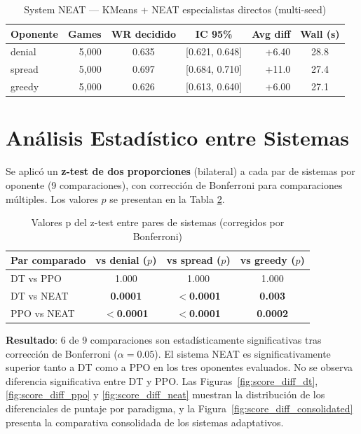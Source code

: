\begin{table}[H]
\centering
\caption{System NEAT --- KMeans + NEAT especialistas directos (multi-seed)}
\begin{tabular}{lrccrc}
\hline
\textbf{Oponente} & \textbf{Games} & \textbf{WR decidido} & \textbf{IC 95\%} & \textbf{Avg diff} & \textbf{Wall (s)} \\
\hline
denial & 5,000 & 0.635 & [0.621, 0.648] & +6.40 & 28.8 \\
spread & 5,000 & 0.697 & [0.684, 0.710] & +11.0 & 27.4 \\
greedy & 5,000 & 0.626 & [0.613, 0.640] & +6.00 & 27.1 \\
\hline
\end{tabular}
\label{tab:system_neat}
\end{table}

\section{Análisis Estadístico entre Sistemas}

Se aplicó un \textbf{z-test de dos proporciones} (bilateral) a cada par de sistemas por oponente (9 comparaciones), con corrección de Bonferroni para comparaciones múltiples. Los valores $p$ se presentan en la Tabla \ref{tab:ztest}.

\begin{table}[H]
\centering
\caption{Valores p del z-test entre pares de sistemas (corregidos por Bonferroni)}
\begin{tabular}{lccc}
\hline
\textbf{Par comparado} & \textbf{vs denial ($p$)} & \textbf{vs spread ($p$)} & \textbf{vs greedy ($p$)} \\
\hline
DT vs PPO   & 1.000 & 1.000 & 1.000 \\
DT vs NEAT  & \textbf{0.0001} & \textbf{$<$0.0001} & \textbf{0.003} \\
PPO vs NEAT & \textbf{$<$0.0001} & \textbf{$<$0.0001} & \textbf{0.0002} \\
\hline
\end{tabular}
\label{tab:ztest}
\end{table}

\textbf{Resultado}: 6 de 9 comparaciones son estadísticamente significativas tras corrección de Bonferroni ($\alpha = 0.05$). El sistema NEAT es significativamente superior tanto a DT como a PPO en los tres oponentes evaluados. No se observa diferencia significativa entre DT y PPO. Las Figuras~\ref{fig:score_diff_dt}, \ref{fig:score_diff_ppo} y \ref{fig:score_diff_neat} muestran la distribución de los diferenciales de puntaje por paradigma, y la Figura~\ref{fig:score_diff_consolidated} presenta la comparativa consolidada de los sistemas adaptativos.

